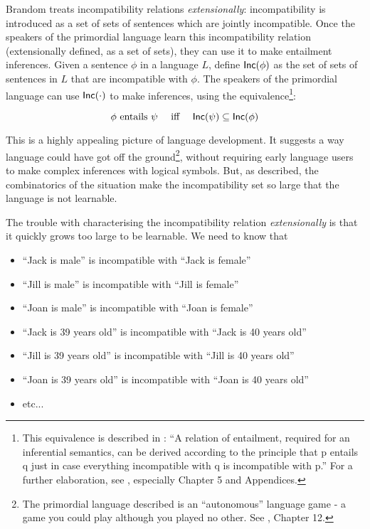 Brandom treats incompatibility relations \emph{extensionally}:
incompatibility is introduced as a set of sets of sentences which are
jointly incompatible.  Once the speakers of the primordial language
learn this incompatibility relation (extensionally defined, as a set
of sets), they can use it to make entailment inferences.  Given a
sentence $\phi$ in a language $L$, define $\mathsf{Inc}(\phi)$ as the set of sets of
sentences in $L$ that are incompatible with $\phi$.  The speakers of the
primordial language can use $\mathsf{Inc}(\cdot)$ to make inferences, using the
equivalence\footnote{This equivalence is described in \cite{brandom2}:
  ``A relation of entailment, required for an inferential semantics,
  can be derived according to the principle that p entails q just in
  case everything incompatible with q is incompatible with p.'' For a
  further elaboration, see \cite{brandom}, especially Chapter 5 and
  Appendices.}:

\[
   \phi \mbox{ entails } \psi \quad \mbox{ iff }\quad \mathsf{Inc}(\psi) \subseteq \mathsf{Inc}(\phi)
\]

\NI This is a highly appealing picture of language development.  It
suggests a way language could have got off the ground\footnote{The
  primordial language described is an ``autonomous'' language game - a
  game you could play although you played no other. See
  \cite{brandom3}, Chapter 12.}, without requiring early language
users to make complex inferences with logical symbols.  But, as
described, the combinatorics of the situation make the incompatibility
set so large that the language is not learnable.

The trouble with characterising the incompatibility relation
\emph{extensionally} is that it quickly grows too large to be
learnable. We need to know that

\begin{itemize}

\item ``Jack is male'' is incompatible with ``Jack is female''
\item ``Jill is male'' is incompatible with ``Jill is female''
\item ``Joan is male'' is incompatible with ``Joan is female''
\item ``Jack is 39 years old'' is incompatible with ``Jack is 40 years old''
\item ``Jill is 39 years old'' is incompatible with ``Jill is 40 years old''
\item ``Joan is 39 years old'' is incompatible with ``Joan is 40 years old''
\item etc...

\end{itemize}

